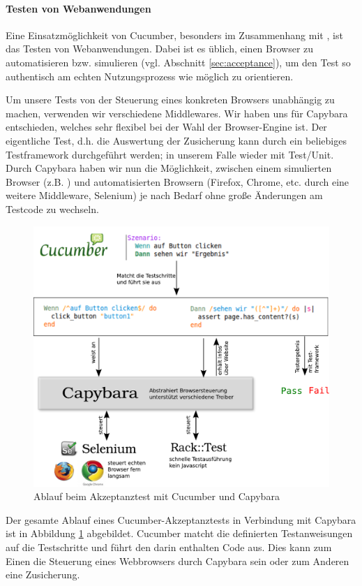 \paragraph{Testen von Webanwendungen}
Eine Einsatzmöglichkeit von Cucumber, besonders im Zusammenhang mit , ist das Testen von Webanwendungen. Dabei ist es üblich, einen Browser zu automatisieren bzw. simulieren (vgl. Abschnitt \ref{sec:acceptance}), um den Test so authentisch am echten Nutzungsprozess wie möglich zu orientieren.

Um unsere Tests von der Steuerung eines konkreten Browsers unabhängig zu machen, verwenden wir verschiedene Middlewares. Wir haben uns für Capybara entschieden, welches sehr flexibel bei der Wahl der Browser-Engine ist. Der eigentliche Test, d.h. die Auswertung der Zusicherung kann durch ein beliebiges Testframework durchgeführt werden; in unserem Falle wieder mit Test/Unit. Durch Capybara haben wir nun die Möglichkeit, zwischen einem simulierten Browser (z.B. \textbf{}) und automatisierten Browsern (Firefox, Chrome, etc. durch eine weitere Middleware, Selenium) je nach Bedarf ohne große Änderungen am Testcode zu wechseln.
\begin{figure}[htbp]
 \centering
 \includegraphics[width=\linewidth]{./diagrams/cucumber.pdf}
 \caption{Ablauf beim Akzeptanztest mit Cucumber und Capybara}
 \label{fig:cucumber}
\end{figure}

Der gesamte Ablauf eines Cucumber-Akzeptanztests in Verbindung mit Capybara ist in Abbildung \ref{fig:cucumber} abgebildet. Cucumber matcht die definierten Testanweisungen auf die Testschritte und führt den darin enthalten Code aus. Dies kann zum Einen die Steuerung eines Webbrowsers durch Capybara sein oder zum Anderen eine Zusicherung.
